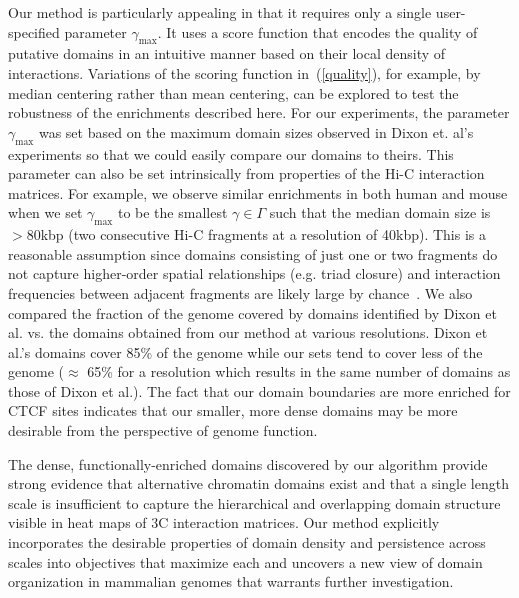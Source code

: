 \documentclass[12pt]{cmuthesis}
\begin{document}
  Our method is particularly appealing in that it requires only a single user-specified parameter $\gamma_{\text{max}}$. It uses a score function that encodes the quality of putative domains in an intuitive manner based on their local density of interactions.  Variations of the scoring function in~(\ref{quality}), for example, by median centering rather than mean centering, can be explored to test the robustness of the enrichments described here. For our experiments, the parameter $\gamma_{\max}$ was set based on the maximum domain sizes observed in Dixon et. al's experiments so that we could easily compare our domains to theirs.  This parameter can also be set intrinsically from properties of the Hi-C interaction matrices.  For example, we observe similar enrichments in both human and mouse when we set $\gamma_{\max}$ to be the smallest $\gamma \in \Gamma$ such that the median domain size is $>$80kbp (two consecutive Hi-C fragments at a resolution of 40kbp). This is a reasonable assumption since domains consisting of just one or two fragments do not capture higher-order spatial relationships (e.g. triad closure) and interaction frequencies between adjacent fragments are likely large by chance~\cite{LiebAid2009}.  We also compared the fraction of the genome covered by domains identified by Dixon et al. vs. the domains obtained from our method at various resolutions.  Dixon et al.'s domains cover 85\% of the genome while our sets tend to cover less of the genome ($\approx$ 65\% for a resolution which results in the same number of domains as those of Dixon et al.).  The fact that our domain boundaries are more enriched for CTCF sites indicates that our smaller, more dense domains may be more desirable from the perspective of genome function.

  The dense, functionally-enriched domains discovered by our algorithm provide strong evidence that alternative chromatin domains exist and that a single length scale is insufficient to capture the hierarchical and overlapping domain structure visible in heat maps of 3C interaction matrices. Our method explicitly incorporates the desirable properties of domain density and persistence across scales into objectives that maximize each and uncovers a new view of domain organization in mammalian genomes that warrants further investigation.


\end{document}

